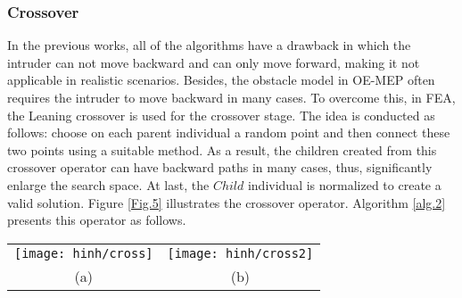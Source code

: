 \documentclass[final]{elsarticle}
\begin{document}
\subsubsection{Crossover}

In the previous works, all of the algorithms have a drawback in which the intruder can not move backward and can only move forward, making it not applicable in realistic scenarios. Besides, the obstacle model in OE-MEP often requires the intruder to move backward in many cases. To overcome this, in FEA, the Leaning crossover is used for the crossover stage. The idea is conducted as follows: choose on each parent individual a random point and then connect these two points using a suitable method. As a result, the children created from this crossover operator can have backward paths in many cases, thus, significantly enlarge the search space. At last, the $Child$ individual is normalized to create a valid solution. Figure \ref{Fig.5} illustrates the crossover operator. Algorithm \ref{alg.2} presents this operator as follows.

\begin{algorithm}[H]
	\SetAlgoLined
	\caption{\textbf{Crossover Operator}} 
	\label{alg.2}
\end{algorithm} 
\begin{figure*}[h]
	\begin{tabular}{cc}
		\texttt{[image: hinh/cross]}&\texttt{[image: hinh/cross2]}\\
		(a) & (b)\\
	\end{tabular}
	\centering
	\caption{Illustration of Leaning crossover operator
	}
	\label{Fig.5}       %
\end{figure*}
\end{document}
